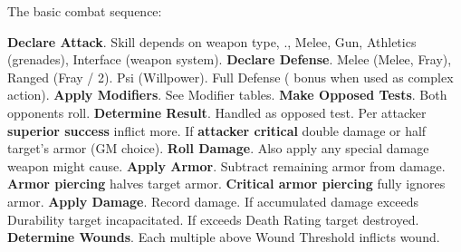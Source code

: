 \begin{figure}
\end{figure}


\bigskip

The basic combat sequence:

\begin{itemize}
    \itembox \textbf{Declare Attack}. Skill depends on weapon type, \eg., Melee, Gun, Athletics (grenades), Interface (weapon system).
    \itembox \textbf{Declare Defense}. Melee (Melee, Fray), Ranged (Fray / 2). Psi (Willpower). Full Defense ( bonus when used as complex action).
    \itembox \textbf{Apply Modifiers}. See Modifier tables.
    \itembox \textbf{Make Opposed Tests}. Both opponents roll.
    \itembox \textbf{Determine Result}. Handled as opposed test. Per attacker \textbf{superior success} inflict  more. If \textbf{attacker critical} double damage or half target's armor (GM choice).
    \itembox \textbf{Roll Damage}. Also apply any special damage weapon might cause.
    \itembox \textbf{Apply Armor}. Subtract remaining armor from damage. \textbf{Armor piercing} halves target armor. \textbf{Critical armor piercing} fully ignores armor.
    \itembox \textbf{Apply Damage}. Record damage. If accumulated damage exceeds Durability target incapacitated. If exceeds Death Rating target destroyed.
    \itembox \textbf{Determine Wounds}. Each multiple above Wound Threshold inflicts wound.
\end{itemize}


